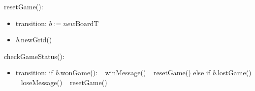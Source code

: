 \documentclass[12pt]{article}
\begin{document}
\noindent resetGame():
\begin{itemize}
\item transition: $b := new \mbox{BoardT}$
\item \textit{b}.\mbox{newGrid()}
\end{itemize}

\noindent checkGameStatus():
\begin{itemize}
\item transition: \newline
      if \textit{b}.\mbox{wonGame()}: \newline
      $~~$ \mbox{winMessage()} \newline
      $~~$ \mbox{resetGame()} \newline
      else if \textit{b}.\mbox{lostGame()} \newline
      $~~$ \mbox{loseMessage()} \newline
      $~~$ \mbox{resetGame()} \newline
\end{itemize}
\newpage
\end{document}
